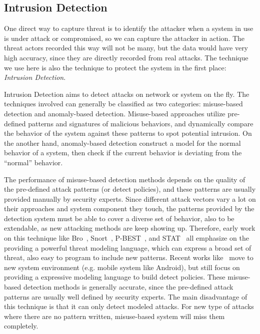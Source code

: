 \subsection{Intrusion Detection}

One direct way to capture threat is to identify the attacker when a
system in use is under attack or compromised, so we can capture the 
attacker in action. The threat actors recorded this way will not be 
many, but the data would have very high accuracy, since they are
directly recorded from real attacks. The technique we use here is also 
the technique to protect the system in the first place:
\textit{Intrusion Detection}.

Intrusion Detection aims to detect attacks on network or system on the
fly. The techniques involved can generally be classified as two 
categories: misuse-based detection and anomaly-based detection.
Misuse-based approaches utilize pre-defined patterns and signatures
of malicious behaviors, and dynamically compare the behavior of the
system against these patterns to spot potential intrusion. On the another
hand, anomaly-based detection construct a model for the normal behavior 
of a system, then check if the current behavior is deviating from the 
``normal'' behavior.

The performance of misuse-based detection methods depends on the quality
of the pre-defined attack patterns (or detect policies), and these 
patterns are usually provided manually by security experts. Since 
different attack vectors vary a lot on their approaches and system 
component they touch, the 
patterns provided by the detection system must be able to cover a 
diverse set of behavior, also to be extendable, as new attacking
methods are keep showing up. Therefore, early work on this technique like
Bro~\cite{paxson1999bro}, Snort~\cite{roesch1999snort}, 
P-BEST~\cite{lindqvist1999detecting}, and STAT~\cite{vigna2003designing}
all emphasize on the providing a powerful threat modeling language, which
can express a broad set of threat, also easy to program to include new 
patterns. Recent works like~\cite{bugiel2012towards} move to new
system environment (e.g. mobile system like Android), but still focus
on providing a expressive modeling language to build detect policies. 
These misuse-based detection methods is generally accurate, since the
pre-defined attack patterns are usually well defined by security experts. 
The main disadvantage of this technique is that it can only detect 
modeled attacks. For new type of attacks where there are no pattern
written, misuse-based system will miss them completely.

